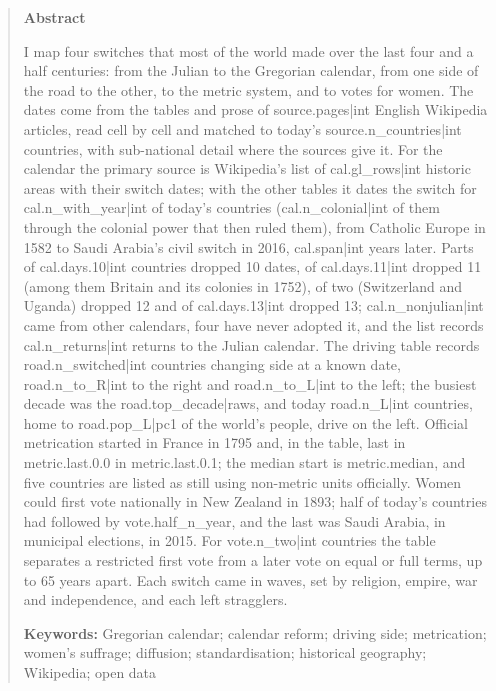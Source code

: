 \documentclass[11pt,a4paper]{article}
\begin{document}
\begin{quote}
\small
\begin{center}\textbf{Abstract}\end{center}
I map four switches that most of the world made over the last four and a half centuries: from the Julian to the Gregorian calendar, from one side of the road to the other, to the metric system, and to votes for women. The dates come from the tables and prose of {{source.pages|int}} English Wikipedia articles, read cell by cell and matched to today's {{source.n_countries|int}} countries, with sub-national detail where the sources give it. For the calendar the primary source is Wikipedia's list of {{cal.gl_rows|int}} historic areas with their switch dates; with the other tables it dates the switch for {{cal.n_with_year|int}} of today's countries ({{cal.n_colonial|int}} of them through the colonial power that then ruled them), from Catholic Europe in 1582 to Saudi Arabia's civil switch in 2016, {{cal.span|int}} years later. Parts of {{cal.days.10|int}} countries dropped 10 dates, of {{cal.days.11|int}} dropped 11 (among them Britain and its colonies in 1752), of two (Switzerland and Uganda) dropped 12 and of {{cal.days.13|int}} dropped 13; {{cal.n_nonjulian|int}} came from other calendars, four have never adopted it, and the list records {{cal.n_returns|int}} returns to the Julian calendar. The driving table records {{road.n_switched|int}} countries changing side at a known date, {{road.n_to_R|int}} to the right and {{road.n_to_L|int}} to the left; the busiest decade was the {{road.top_decade|raw}}s, and today {{road.n_L|int}} countries, home to {{road.pop_L|pc1}} of the world's people, drive on the left. Official metrication started in France in 1795 and, in the table, last in {{metric.last.0.0}} in {{metric.last.0.1}}; the median start is {{metric.median}}, and five countries are listed as still using non-metric units officially. Women could first vote nationally in New Zealand in 1893; half of today's countries had followed by {{vote.half_n_year}}, and the last was Saudi Arabia, in municipal elections, in 2015. For {{vote.n_two|int}} countries the table separates a restricted first vote from a later vote on equal or full terms, up to 65 years apart. Each switch came in waves, set by religion, empire, war and independence, and each left stragglers.

\textbf{Keywords:} Gregorian calendar; calendar reform; driving side; metrication; women's suffrage; diffusion; standardisation; historical geography; Wikipedia; open data
\end{quote}
\end{document}
